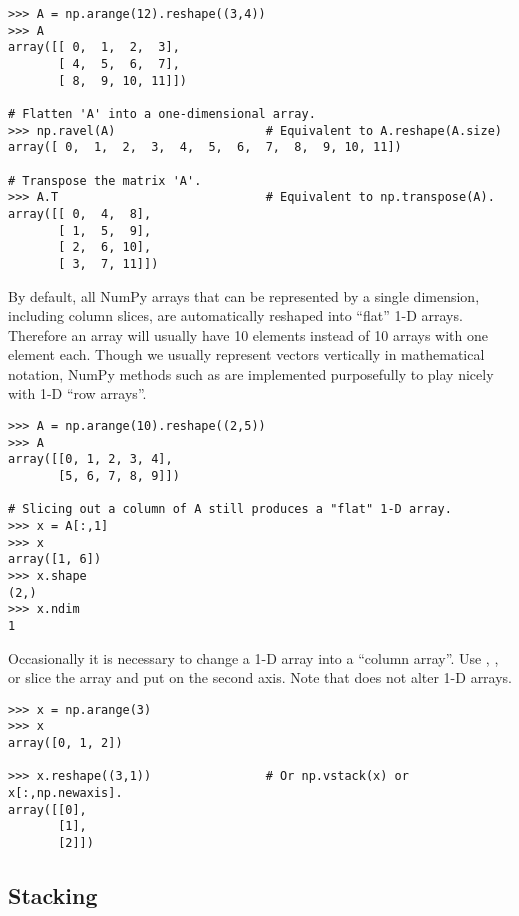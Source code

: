 \begin{lstlisting}
>>> A = np.arange(12).reshape((3,4))
>>> A
array([[ 0,  1,  2,  3],
       [ 4,  5,  6,  7],
       [ 8,  9, 10, 11]])

# Flatten 'A' into a one-dimensional array.
>>> np.ravel(A)                     # Equivalent to A.reshape(A.size)
array([ 0,  1,  2,  3,  4,  5,  6,  7,  8,  9, 10, 11])

# Transpose the matrix 'A'.
>>> A.T                             # Equivalent to np.transpose(A).
array([[ 0,  4,  8],
       [ 1,  5,  9],
       [ 2,  6, 10],
       [ 3,  7, 11]])
\end{lstlisting}

\begin{info} %
By default, all NumPy arrays that can be represented by a single dimension, including column slices, are automatically reshaped into ``flat'' 1-D arrays.
Therefore an array will usually have 10 elements instead of 10 arrays with one element each.
Though we usually represent vectors vertically in mathematical notation, NumPy methods such as  are implemented purposefully to play nicely with 1-D ``row arrays''.

\begin{lstlisting}
>>> A = np.arange(10).reshape((2,5))
>>> A
array([[0, 1, 2, 3, 4],
       [5, 6, 7, 8, 9]])

# Slicing out a column of A still produces a "flat" 1-D array.
>>> x = A[:,1]
>>> x
array([1, 6])
>>> x.shape
(2,)
>>> x.ndim
1
\end{lstlisting}

Occasionally it is necessary to change a 1-D array into a ``column array''.
Use , , or slice the array and put  on the second axis.
Note that  does not alter 1-D arrays.

\begin{lstlisting}
>>> x = np.arange(3)
>>> x
array([0, 1, 2])

>>> x.reshape((3,1))                # Or np.vstack(x) or x[:,np.newaxis].
array([[0],
       [1],
       [2]])
\end{lstlisting}
\end{info}

\subsection*{Stacking} %

